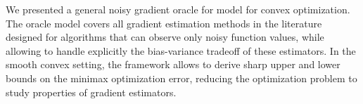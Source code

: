 
We presented a general noisy  gradient oracle for model for convex optimization. The oracle model covers all gradient estimation methods in the literature designed for algorithms that can observe only noisy function values, while allowing to handle explicitly the bias-variance tradeoff of these estimators. In the smooth convex setting, the framework allows to derive sharp upper and lower bounds on the minimax optimization error, reducing the optimization problem to study properties of gradient estimators.

